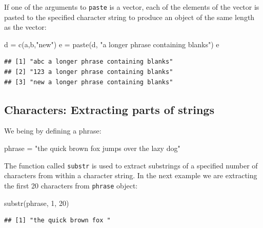 \documentclass[
]{book}
\newenvironment{Shaded}{\begin{snugshade}}{\end{snugshade}}
\newcommand{\DecValTok}[1]{\textcolor[rgb]{0.00,0.00,0.81}{#1}}
\newcommand{\FunctionTok}[1]{\textcolor[rgb]{0.00,0.00,0.00}{#1}}
\newcommand{\NormalTok}[1]{#1}
\newcommand{\OtherTok}[1]{\textcolor[rgb]{0.56,0.35,0.01}{#1}}
\newcommand{\StringTok}[1]{\textcolor[rgb]{0.31,0.60,0.02}{#1}}
\theoremstyle{definition}
\theoremstyle{definition}
\theoremstyle{definition}
\theoremstyle{definition}
\theoremstyle{remark}
\begin{document}
If one of the arguments to \texttt{paste} is a vector, each of the elements of the vector is pasted to the specified character string to produce an object of the same length as the vector:

\begin{Shaded}
\begin{Highlighting}[]
\NormalTok{d }\OtherTok{=} \FunctionTok{c}\NormalTok{(a,b,}\StringTok{"new"}\NormalTok{)}
\NormalTok{e }\OtherTok{=} \FunctionTok{paste}\NormalTok{(d, }\StringTok{"a longer phrase containing blanks"}\NormalTok{)}
\NormalTok{e}
\end{Highlighting}
\end{Shaded}

\begin{verbatim}
## [1] "abc a longer phrase containing blanks"
## [2] "123 a longer phrase containing blanks"
## [3] "new a longer phrase containing blanks"
\end{verbatim}

\hypertarget{characters-extracting-parts-of-strings}{%
\subsection{Characters: Extracting parts of strings}\label{characters-extracting-parts-of-strings}}

We being by defining a phrase:

\begin{Shaded}
\begin{Highlighting}[]
\NormalTok{phrase }\OtherTok{=} \StringTok{"the quick brown fox jumps over the lazy dog"}
\end{Highlighting}
\end{Shaded}

The function called \texttt{substr} is used to extract substrings of a specified number of characters from within a character string. In the next example we are extracting the first 20 characters from \texttt{phrase} object:

\begin{Shaded}
\begin{Highlighting}[]
\FunctionTok{substr}\NormalTok{(phrase, }\DecValTok{1}\NormalTok{, }\DecValTok{20}\NormalTok{)}
\end{Highlighting}
\end{Shaded}

\begin{verbatim}
## [1] "the quick brown fox "
\end{verbatim}
\end{document}
